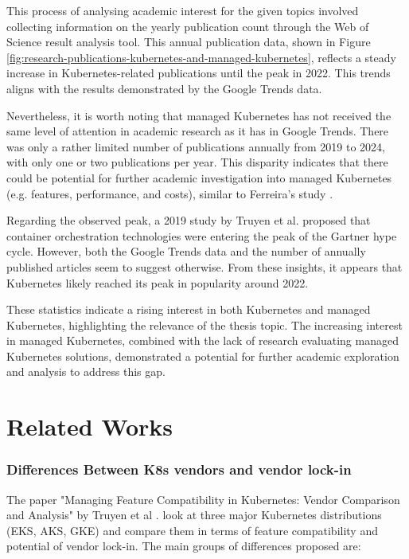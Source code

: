 This process of analysing academic interest for the given topics involved collecting information on the yearly publication count through the Web of Science result analysis tool. This annual publication data, shown in Figure \ref{fig:research-publications-kubernetes-and-managed-kubernetes}, reflects a steady increase in Kubernetes-related publications until the peak in 2022. This trends aligns with the results demonstrated by the Google Trends data.

Nevertheless, it is worth noting that managed Kubernetes has not received the same level of attention in academic research as it has in Google Trends. There was only a rather limited number of publications annually from 2019 to 2024, with only one or two publications per year. This disparity indicates that there could be potential for further academic investigation into managed Kubernetes (e.g. features, performance, and costs), similar to Ferreira’s study \cite{pereira_ferreira_performance_2019}.

Regarding the observed peak, a 2019 study by Truyen et al. \cite{truyen_comprehensive_2019} proposed that container orchestration technologies were entering the peak of the Gartner hype cycle. However, both the Google Trends data and the number of annually published articles seem to suggest otherwise. From these insights, it appears that Kubernetes likely reached its peak in popularity around 2022.

These statistics indicate a rising interest in both Kubernetes and managed Kubernetes, highlighting the relevance of the thesis topic. The increasing interest in managed Kubernetes, combined with the lack of research evaluating managed Kubernetes solutions, demonstrated a potential for further academic exploration and analysis to address this gap.

\section{Related Works}
\subsubsection{Differences Between K8s vendors and vendor lock-in}
The paper "Managing Feature Compatibility in Kubernetes: Vendor Comparison and Analysis" by Truyen et al \cite{truyen_managing_2020}. look at three major Kubernetes distributions (EKS, AKS, GKE) and compare them in terms of feature compatibility and potential of vendor lock-in. The main groups of differences proposed are:

